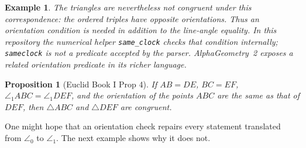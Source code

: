 \documentclass[reqno]{amsart}
\DeclareMathOperator{\1}{\textbf{1}}
\newtheorem{prop}[thm]{Proposition}
\newtheorem{example}[thm]{Example}
\begin{document}
\begin{example}

    The triangles are nevertheless not congruent under this correspondence: the
    ordered triples have opposite orientations. Thus an orientation condition
    is needed in addition to the line-angle equality. In this repository the
    numerical helper \verb|same_clock| checks that condition internally;
    \verb|sameclock| is not a predicate accepted by the parser. AlphaGeometry~2
    exposes a related orientation predicate in its richer language.
\end{example}

\begin{prop}[Euclid Book I Prop 4]\label{prop: Euclid Book 1 Prop 4 Angle 1} 
        If $AB = DE$, $BC = EF$, $\angle_1 ABC = \angle_1DEF$, and the
        orientation of the points $ABC$ are the same as that of $DEF$, then
        $\triangle ABC$ and $\triangle DEF$ are congruent.
\end{prop}

One might hope that an orientation check repairs every statement translated
from $\angle_0$ to $\angle_1$. The next example shows why it does not.
\end{document}
